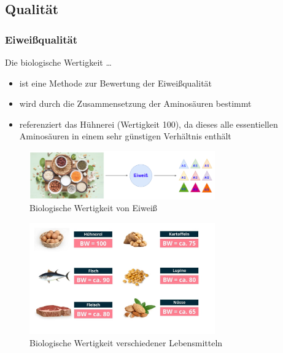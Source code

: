 \documentclass[xcolor=dvipsnames]{beamer}
\begin{document}
    \subsection{Qualität}
    \begin{frame}[allowframebreaks]
        \frametitle{Eiweißqualität}

        \begin{block}{Die biologische Wertigkeit \ldots}
            \begin{itemize}
                \setlength\itemsep{1em}
                \item ist eine Methode zur Bewertung der Eiweißqualität
                \item wird durch die Zusammensetzung der Aminosäuren bestimmt
                \item referenziert das Hühnerei (Wertigkeit 100), da dieses alle essentiellen Aminosäuren in einem sehr günstigen Verhältnis enthält
            \end{itemize}
        \end{block}

        \begin{figure}
            \centering
            \includegraphics[width=8cm]{../images/as4.png}
            \caption{Biologische Wertigkeit von Eiweiß}
        \end{figure}

        \framebreak

        \begin{figure}
            \centering
            \includegraphics[width=8cm]{../images/as5.jpg}
            \caption{Biologische Wertigkeit verschiedener Lebensmitteln}
        \end{figure}

        \framebreak


\end{frame}
\end{document}
